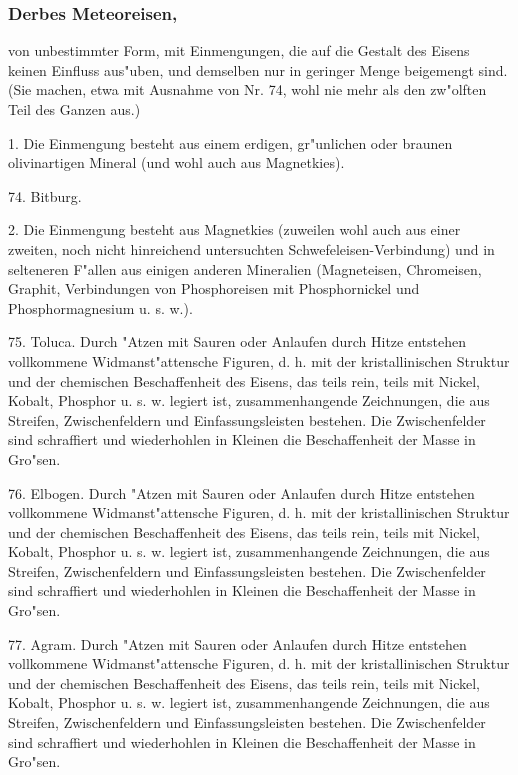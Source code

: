 \documentclass[a4paper, 11pt, oneside, polutonikogreek, german]{article}
\begin{document}
\subsubsection[Derbes Meteoreisen.]{Derbes Meteoreisen,}
von unbestimmter Form, mit Einmengungen, die auf die Gestalt des Eisens keinen Einfluss aus"uben, und demselben nur in geringer Menge beigemengt sind. (Sie machen, etwa mit Ausnahme von Nr. 74, wohl nie mehr als den zw"olften Teil des Ganzen aus.)

\vspace{2ex}

1. Die Einmengung besteht aus einem erdigen, gr"unlichen oder braunen olivinartigen Mineral (und wohl auch aus Magnetkies).

\vspace{2ex}

74. Bitburg.

\vspace{2ex}

2. Die Einmengung besteht aus Magnetkies (zuweilen wohl auch aus einer zweiten, noch nicht hinreichend untersuchten Schwefeleisen-Verbindung) und in selteneren F"allen aus einigen anderen Mineralien (Magneteisen, Chromeisen, Graphit, Verbindungen von Phosphoreisen mit Phosphornickel und Phosphormagnesium u. s. w.).

\vspace{2ex}

75. Toluca. Durch "Atzen mit Sauren oder Anlaufen durch Hitze entstehen vollkommene Widmanst"attensche Figuren, d. h. mit der kristallinischen Struktur und der chemischen Beschaffenheit des Eisens, das teils rein, teils mit Nickel, Kobalt, Phosphor u. s. w. legiert ist, zusammenhangende Zeichnungen, die aus Streifen, Zwischenfeldern und Einfassungsleisten bestehen. Die Zwischenfelder sind schraffiert und wiederhohlen in Kleinen die Beschaffenheit der Masse in Gro"sen.

76. Elbogen. Durch "Atzen mit Sauren oder Anlaufen durch Hitze entstehen vollkommene Widmanst"attensche Figuren, d. h. mit der kristallinischen Struktur und der chemischen Beschaffenheit des Eisens, das teils rein, teils mit Nickel, Kobalt, Phosphor u. s. w. legiert ist, zusammenhangende Zeichnungen, die aus Streifen, Zwischenfeldern und Einfassungsleisten bestehen. Die Zwischenfelder sind schraffiert und wiederhohlen in Kleinen die Beschaffenheit der Masse in Gro"sen.

77. Agram. Durch "Atzen mit Sauren oder Anlaufen durch Hitze entstehen vollkommene Widmanst"attensche Figuren, d. h. mit der kristallinischen Struktur und der chemischen Beschaffenheit des Eisens, das teils rein, teils mit Nickel, Kobalt, Phosphor u. s. w. legiert ist, zusammenhangende Zeichnungen, die aus Streifen, Zwischenfeldern und Einfassungsleisten bestehen. Die Zwischenfelder sind schraffiert und wiederhohlen in Kleinen die Beschaffenheit der Masse in Gro"sen.
\end{document}
